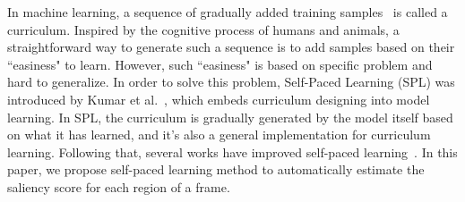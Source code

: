 In machine learning, a sequence of gradually  added training samples~\cite{bengio2009curriculum} is called a curriculum. 
Inspired by the cognitive process of humans and animals, a straightforward way to generate such a sequence is to add samples based on their ``easiness" to learn. 
However, such ``easiness" is based on specific problem and hard to generalize. 
In order to solve this problem, Self-Paced Learning (SPL) was introduced by Kumar et al.~\cite{kumar2010self}, which embeds curriculum designing into model learning. 
In SPL, the curriculum is gradually generated by the model itself based on what it has learned, and it's also a general implementation for curriculum learning. 
Following that, several works have improved self-paced learning~\cite{jiang2014easy,tang2012shifting,jiang2015self}. 
In this paper, we propose self-paced learning method to automatically estimate the saliency score for each region of a frame.

